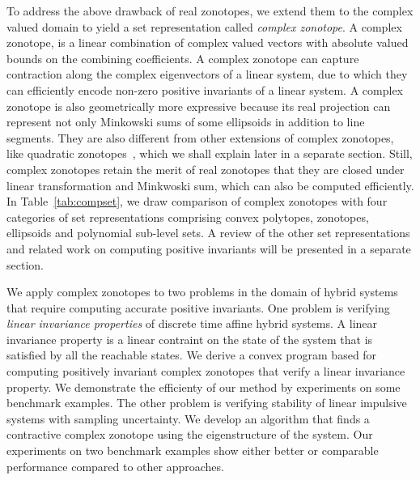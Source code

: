 To address the above drawback of real zonotopes, we extend them to the
complex valued domain to yield a set representation called {\it
complex zonotope}.  A complex zonotope, is a linear combination of
complex valued vectors with absolute valued bounds on the combining
coefficients.  A complex zonotope can capture contraction along the
complex eigenvectors of a linear system, due to which they can
efficiently encode non-zero positive invariants of a linear system.  A
complex zonotope is also geometrically more expressive because its
real projection can represent not only Minkowski sums of some
ellipsoids in addition to line segments.  They are also different from
other extensions of complex zonotopes, like quadratic
zonotopes~\cite{DBLP:conf/aplas/AdjeGW15}, which we shall explain
later in a separate section.  Still, complex zonotopes retain the
merit of real zonotopes that they are closed under linear
transformation and Minkwoski sum, which can also be computed
efficiently.  In Table~\ref{tab:compset}, we draw comparison of complex
zonotopes with four categories of set representations comprising
convex polytopes, zonotopes, ellipsoids and polynomial sub-level sets.
A review of the other set representations and related work on
computing positive invariants will be presented in a separate section.

We apply complex zonotopes to two problems in the domain of hybrid
systems that require computing accurate positive invariants.  One
problem is verifying \emph{linear invariance properties} of discrete
time affine hybrid systems.  A linear invariance property is a linear
contraint on the state of the system that is satisfied by all the
reachable states.  We derive a convex program based for computing
positively invariant complex zonotopes that verify a linear invariance
property.  We demonstrate the efficienty of our method by experiments
on some benchmark examples.  The other problem is verifying stability
of linear impulsive systems with sampling uncertainty.  We develop an
algorithm that finds a contractive complex zonotope using the
eigenstructure of the system.  Our experiments on two benchmark
examples show either better or comparable performance compared to
other approaches.




